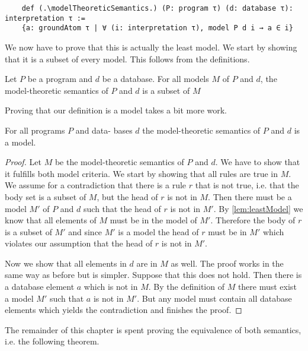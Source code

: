 \begin{lstlisting}
    def (.\modelTheoreticSemantics.) (P: program τ) (d: database τ): interpretation τ := 
    {a: groundAtom τ | ∀ (i: interpretation τ), model P d i → a ∈ i}
\end{lstlisting}

We now have to prove that this is actually the least model. We start by showing that it is a subset of every model. This follows from the definitions.

\begin{lemma}[\leastModel]\label{lem:leastModel}
    Let $P$ be a program and $d$ be a database. For all models $M$ of $P$ and $d$, the model-theoretic semantics of $P$ and $d$ is a subset of $M$
\end{lemma}

Proving that our definition is a model takes a bit more work.

\begin{lemma}[\modelTheoreticSemanticsIsModel]\label{lem:modelMTS}
    For all programs $P$ and data- bases $d$ the model-theoretic semantics of $P$ and $d$ is a model.
\end{lemma}
\begin{proof}
    Let $M$ be the model-theoretic semantics of $P$ and $d$. We have to show that it fulfills both model criteria.
    We start by showing that all rules are true in $M$. We assume for a contradiction that there is a rule $r$ that is not true, i.e. that the body set is a subset of $M$, but the head of $r$ is not in $M$. Then there must be a model $M'$ of $P$ and $d$ such that the head of $r$ is not in $M'$. By \cref{lem:leastModel} we know that all elements of $M$ must be in the model of $M'$. Therefore the body of $r$ is a subset of $M'$ and since $M'$ is a model the head of $r$ must be in $M'$ which violates our assumption that the head of $r$ is not in $M'$.

    Now we show that all elements in $d$ are in $M$ as well. The proof works in the same way as before but is simpler. Suppose that this does not hold. Then there is a database element $a$ which is not in $M$. By the definition of $M$ there must exist a model $M'$ such that $a$ is not in $M'$. But any model must contain all database elements which yields the contradiction and finishes the proof.
\end{proof}

The remainder of this chapter is spent proving the equivalence of both semantics, i.e. the following theorem.

